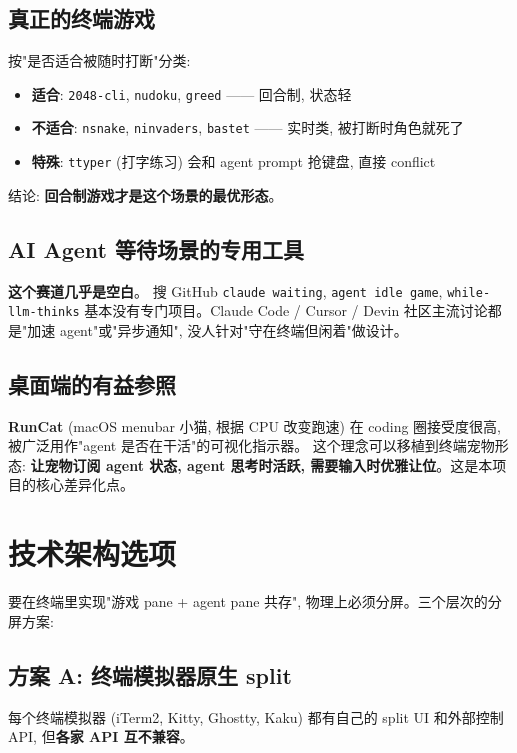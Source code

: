\documentclass[11pt]{article}
\begin{document}
\subsection{真正的终端游戏}

按"是否适合被随时打断"分类:
\begin{itemize}[leftmargin=*]
  \item \textbf{适合}: \texttt{2048-cli}, \texttt{nudoku}, \texttt{greed} —— 回合制, 状态轻
  \item \textbf{不适合}: \texttt{nsnake}, \texttt{ninvaders}, \texttt{bastet} —— 实时类,
        被打断时角色就死了
  \item \textbf{特殊}: \texttt{ttyper} (打字练习) 会和 agent prompt 抢键盘, 直接 conflict
\end{itemize}

结论: \textbf{回合制游戏才是这个场景的最优形态}。

\subsection{AI Agent 等待场景的专用工具}

\textbf{这个赛道几乎是空白}。
搜 GitHub \texttt{claude waiting}, \texttt{agent idle game}, \texttt{while-llm-thinks}
基本没有专门项目。Claude Code / Cursor / Devin 社区主流讨论都是"加速 agent"或"异步通知",
没人针对"守在终端但闲着"做设计。

\subsection{桌面端的有益参照}

\textbf{RunCat} (macOS menubar 小猫, 根据 CPU 改变跑速) 在 coding 圈接受度很高,
被广泛用作"agent 是否在干活"的可视化指示器。
这个理念可以移植到终端宠物形态: \textbf{让宠物订阅 agent 状态, agent 思考时活跃,
需要输入时优雅让位}。这是本项目的核心差异化点。

\section{技术架构选项}

要在终端里实现"游戏 pane + agent pane 共存", 物理上必须分屏。三个层次的分屏方案:

\subsection{方案 A: 终端模拟器原生 split}

每个终端模拟器 (iTerm2, Kitty, Ghostty, Kaku) 都有自己的 split UI 和外部控制 API,
但\textbf{各家 API 互不兼容}。
\end{document}
